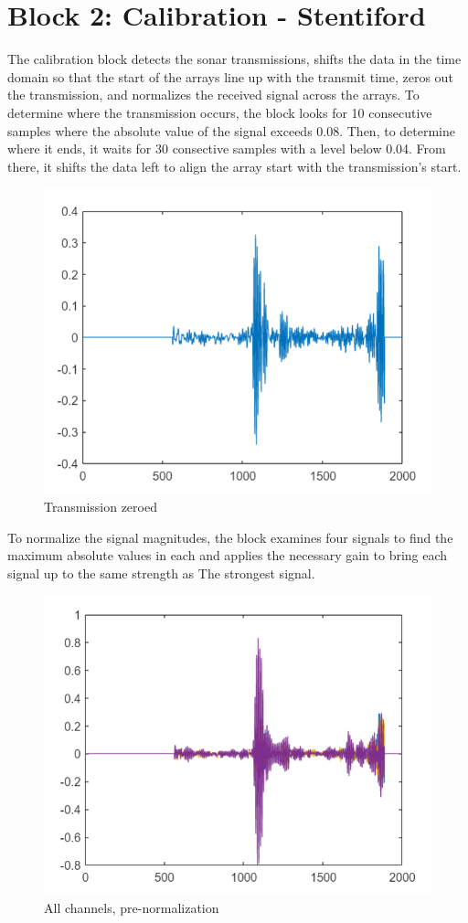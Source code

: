 
\section{Block 2: Calibration - Stentiford}

The calibration block detects the sonar transmissions, shifts the data in the time domain so that the start
 of the arrays line up with the transmit time, zeros out the transmission, and normalizes the received signal
 across the arrays. To determine where the transmission occurs, the block looks for 10 consecutive samples where
 the absolute value of the signal exceeds 0.08. Then, to determine where it ends, it waits for 30 consective
 samples with a level below 0.04. From there, it shifts the data left to align the array start with the
 transmission's start.
 
\begin{figure}[H]
    \centering
    \includegraphics[width=0.5\linewidth]{figures/tx_zero.PNG}
    \caption{Transmission zeroed}
\end{figure}
 
 To normalize the signal magnitudes, the block examines four signals to find the maximum
 absolute values in each and applies the necessary gain to bring each signal up to the same strength as The
 strongest signal.

\begin{figure}[H]
    \centering
    \includegraphics[width=0.5\linewidth]{figures/all_channels.PNG}
    \caption{All channels, pre-normalization}
\end{figure}


